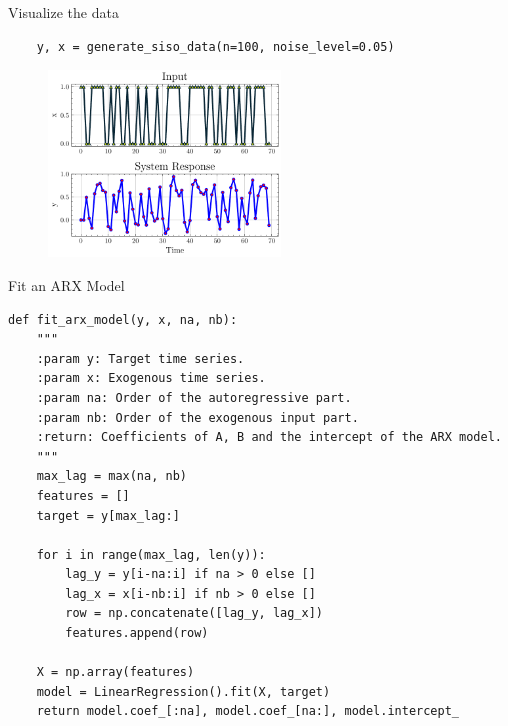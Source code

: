 \documentclass[aspectratio=169,hyperref={pdfpagelabels=false}]{beamer}
\begin{document}
\begin{frame}[fragile]{Visualize the data}
  \begin{verbatim}
    y, x = generate_siso_data(n=100, noise_level=0.05)
  \end{verbatim}
  \begin{figure}
    \centering
    \includegraphics[width=0.55\textwidth]{img/response.pdf}
    \label{fig:your-plot}
  \end{figure}
\end{frame}

\begin{frame}[fragile]{\small{Fit an ARX Model}}
  \begin{verbatim}
def fit_arx_model(y, x, na, nb):
    """
    :param y: Target time series.
    :param x: Exogenous time series.
    :param na: Order of the autoregressive part.
    :param nb: Order of the exogenous input part.
    :return: Coefficients of A, B and the intercept of the ARX model.
    """
    max_lag = max(na, nb)
    features = []
    target = y[max_lag:]

    for i in range(max_lag, len(y)):
        lag_y = y[i-na:i] if na > 0 else []
        lag_x = x[i-nb:i] if nb > 0 else []
        row = np.concatenate([lag_y, lag_x])
        features.append(row)

    X = np.array(features)
    model = LinearRegression().fit(X, target)
    return model.coef_[:na], model.coef_[na:], model.intercept_
  \end{verbatim}
\end{frame}
\end{document}
